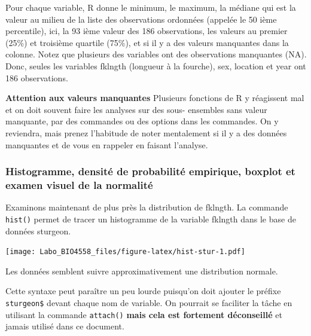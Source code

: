 \documentclass[
  12pt,
]{book}
\makeatletter
\newenvironment{Shaded}{\begin{snugshade}}{\end{snugshade}}
\newcommand{\KeywordTok}[1]{\textcolor[rgb]{0.13,0.29,0.53}{\textbf{#1}}}
\newcommand{\NormalTok}[1]{#1}
\newcommand{\OperatorTok}[1]{\textcolor[rgb]{0.81,0.36,0.00}{\textbf{#1}}}
\newenvironment{kframe}{%
\medskip{}
\setlength{\fboxsep}{.8em}
\def\at@end@of@kframe{}%
\ifinner\ifhmode%
 \def\at@end@of@kframe{\end{minipage}}%
 \begin{minipage}{\columnwidth}%
\fi\fi%
\def\FrameCommand##1{\hskip\@totalleftmargin \hskip-\fboxsep
\colorbox{incolor}{##1}\hskip-\fboxsep
    \hskip-\linewidth \hskip-\@totalleftmargin \hskip\columnwidth}%
\MakeFramed {\advance\hsize-\width
  \@totalleftmargin\z@ \linewidth\hsize
  \@setminipage}}%
{\par\unskip\endMakeFramed%
\at@end@of@kframe}
\newenvironment{rmdblock}[1]
 {
 \begin{itemize}
 \renewcommand{\labelitemi}{
   \raisebox{-.7\height}[0pt][0pt]{
     {\setkeys{Gin}{width=3em,keepaspectratio}\texttt{[image: images/\#1]}}
   }
 }
 \begin{kframe}
 \setlength{\fboxsep}{1em}
 \item
 }
 {
 \end{kframe}
 \end{itemize}
 }
\newenvironment{rmdnote}
  {\begin{rmdblock}{note}}
  {\end{rmdblock}}
\newenvironment{rmdwarning}
  {\begin{rmdblock}{warning}}
  {\end{rmdblock}}
\makeatother
\begin{document}
Pour chaque variable, R donne le minimum, le maximum, la médiane qui est la valeur au milieu de la liste des observations ordonnées (appelée le 50 ième percentile), ici, la 93 ième valeur des 186 observations, les valeurs au premier (25\%) et troisième quartile (75\%), et si il y a des valeurs manquantes dans la colonne.
Notez que plusieurs des variables ont des observations manquantes (NA).
Donc, seules les variables fklngth (longueur à la fourche), sex, location et year ont 186 observations.

\begin{rmdwarning}
\textbf{Attention aux valeurs manquantes}
Plusieurs fonctions de R y réagissent mal et on doit souvent faire les analyses sur des sous- ensembles sans valeur manquante, par des commandes ou des options dans les commandes.
On y reviendra, mais prenez l'habitude de noter mentalement si il y a des données manquantes et de vous en rappeler en faisant l'analyse.
\end{rmdwarning}

\hypertarget{histogramme-densituxe9-de-probabilituxe9-empirique-boxplot-et-examen-visuel-de-la-normalituxe9}{%
\subsubsection{Histogramme, densité de probabilité empirique, boxplot et examen visuel de la normalité}\label{histogramme-densituxe9-de-probabilituxe9-empirique-boxplot-et-examen-visuel-de-la-normalituxe9}}

Examinons maintenant de plus près la distribution de fklngth.
La commande \texttt{hist()} permet de tracer un histogramme de la variable fklngth dans le base de données sturgeon.

\begin{Shaded}
\end{Shaded}

\texttt{[image: Labo\_BIO4558\_files/figure-latex/hist-stur-1.pdf]}

Les données semblent suivre approximativement une distribution normale.

\begin{rmdnote}
Cette syntaxe peut paraître un peu lourde puisqu'on doit ajouter le préfixe \texttt{sturgeon\$} devant chaque nom de variable.
On pourrait se faciliter la tâche en utilisant la commande \texttt{attach()} \textbf{mais cela est fortement déconseillé} et jamais utilisé dans ce document.
\end{rmdnote}
\end{document}
